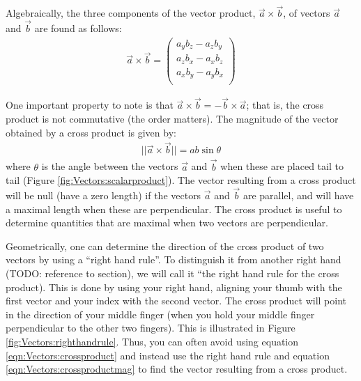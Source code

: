 Algebraically, the three components of the vector product, $\vec a\times \vec b$, of vectors $\vec a$ and $\vec b$ are found as follows:
\begin{align}
\label{eqn:Vectors:crossproduct}
\vec a \times \vec b =\begin{pmatrix}
           a_yb_z - a_z b_y\\
           a_zb_x - a_x b_z\\
           a_xb_y - a_y b_x\\
         \end{pmatrix}
\end{align}

One important property to note is that $\vec a \times \vec b = -\vec b \times \vec a$; that is, the cross product is not commutative (the order matters). The magnitude of the vector obtained by a cross product is given by:
\begin{align}
\label{eqn:Vectors:crossproductmag}
||\vec a \times \vec b ||=ab\sin\theta
\end{align}
where $\theta$ is the angle between the vectors $\vec a$ and $\vec b$ when these are placed tail to tail (Figure \ref{fig:Vectors:scalarproduct}). The vector resulting from a cross product will be null (have a zero length) if the vectors $\vec a$ and $\vec b$ are parallel, and will have a maximal length when these are perpendicular. The cross product is useful to determine quantities that are maximal when two vectors are perpendicular. 

Geometrically, one can determine the direction of the cross product of two vectors by using a ``right hand rule''. To distinguish it from another right hand (TODO: reference to section), we will call it ``the right hand rule for the cross product). This is done by using your right hand, aligning your thumb with the first vector and your index with the second vector. The cross product will point in the direction of your middle finger (when you hold your middle finger perpendicular to the other two fingers). This is illustrated in Figure \ref{fig:Vectors:righthandrule}. Thus, you can often avoid using equation \ref{eqn:Vectors:crossproduct} and instead use the right hand rule and equation \ref{eqn:Vectors:crossproductmag} to find the vector resulting from a cross product.


